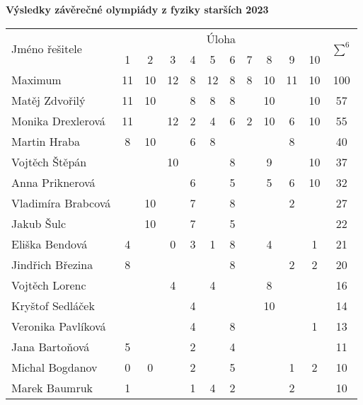\documentclass[12pt,a4paper,landscape]{article}
\begin{document}
\begin{center}
\textbf{\Large Výsledky závěrečné olympiády z fyziky starších 2023}
\vspace{1em}

{\large
\noindent\begin{tabular}{|l||c|c|c|c|c|c|c|c|c|c||c|}
\hline
\multirow{2}{*}{Jméno řešitele} & \multicolumn{10}{|c||}{Úloha} & \multirow{2}{*}{$\sum^6$} \\
\cline{2-11}
 & 1 & 2 & 3 & 4 & 5 & 6 & 7 & 8 & 9 & 10 & \\
\hline
Maximum & 11 & 10 & 12 & 8 & 12 & 8 & 8 & 10 & 11 & 10 & 100 \\
\hline\hline
Matěj Zdvořilý	&	11	&	10	&		&	8	&	8	&	8	&		&	10	&		&	10	&	57	\\
Monika Drexlerová	&	11	&		&	12	&	2	&	4	&	6	&	2	&	10	&	6	&	10	&	55	\\
Martin Hraba	&	8	&	10	&		&	6	&	8	&		&		&		&	8	&		&	40	\\
Vojtěch Štěpán	&		&		&	10	&		&		&	8	&		&	9	&		&	10	&	37	\\
Anna Priknerová	&		&		&		&	6	&		&	5	&		&	5	&	6	&	10	&	32	\\
Vladimíra Brabcová	&		&	10	&		&	7	&		&	8	&		&		&	2	&		&	27	\\
Jakub Šulc	&		&	10	&		&	7	&		&	5	&		&		&		&		&	22	\\
Eliška Bendová	&	4	&		&	0	&	3	&	1	&	8	&		&	4	&		&	1	&	21	\\
Jindřich Březina	&	8	&		&		&		&		&	8	&		&		&	2	&	2	&	20	\\
Vojtěch Lorenc	&		&		&	4	&		&	4	&		&		&	8	&		&		&	16	\\
Kryštof Sedláček	&		&		&		&	4	&		&		&		&	10	&		&		&	14	\\
Veronika Pavlíková	&		&		&		&	4	&		&	8	&		&		&		&	1	&	13	\\
Jana Bartoňová	&	5	&		&		&	2	&		&	4	&		&		&		&		&	11	\\
Michal Bogdanov	&	0	&	0	&		&	2	&		&	5	&		&		&	1	&	2	&	10	\\
Marek Baumruk	&	1	&		&		&	1	&	4	&	2	&		&		&	2	&		&	10	\\
\hline
\end{tabular}
}
\end{center}
\end{document}
